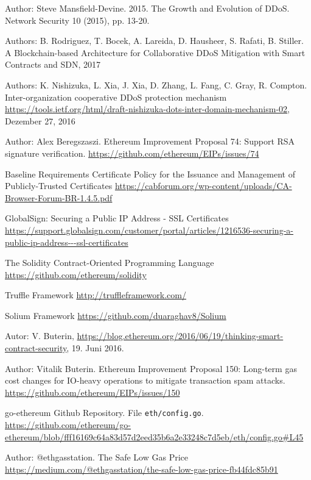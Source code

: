 \begin{thebibliography}{99}

 Author: Steve Mansfield-Devine. 2015. The Growth and Evolution of DDoS. Network
Security 10 (2015), pp. 13-20.

 Authors: B. Rodriguez, T. Bocek, A. Lareida, D. Hausheer, S. Rafati, B. Stiller. A Blockchain-based Architecture for Collaborative DDoS Mitigation with Smart Contracts and SDN, 2017

Authors: K. Nishizuka, L. Xia, J. Xia, D. Zhang, L. Fang, C. Gray, R. Compton. Inter-organization cooperative DDoS protection mechanism \url{https://tools.ietf.org/html/draft-nishizuka-dots-inter-domain-mechanism-02}, Dezember 27, 2016


 Author: Alex Beregszaszi. Ethereum Improvement Proposal 74: Support RSA signature verification. \url{https://github.com/ethereum/EIPs/issues/74}

 Baseline Requirements Certificate Policy for the Issuance and Management of Publicly-Trusted Certificates \url{https://cabforum.org/wp-content/uploads/CA-Browser-Forum-BR-1.4.5.pdf}

 GlobalSign: Securing a Public IP Address - SSL Certificates
\url{https://support.globalsign.com/customer/portal/articles/1216536-securing-a-public-ip-address---ssl-certificates}

 The Solidity Contract-Oriented Programming Language
\url{https://github.com/ethereum/solidity}


 Truffle Framework \url{http://truffleframework.com/}

 Solium Framework \url{https://github.com/duaraghav8/Solium}

 Autor: V. Buterin, \url{https://blog.ethereum.org/2016/06/19/thinking-smart-contract-security}, 19. Juni 2016.


 Author: Vitalik Buterin. Ethereum Improvement Proposal 150: Long-term gas cost changes for IO-heavy operations to mitigate transaction spam attacks. \url{https://github.com/ethereum/EIPs/issues/150}


 go-ethereum Github Repository. File \texttt{eth/config.go}. \url{https://github.com/ethereum/go-ethereum/blob/fff16169c64a83d57d2eed35b6a2e33248c7d5eb/eth/config.go\#L45}

 Author: @ethgasstation. The Safe Low Gas Price \url{https://medium.com/@ethgasstation/the-safe-low-gas-price-fb44fdc85b91}



\end{thebibliography}

